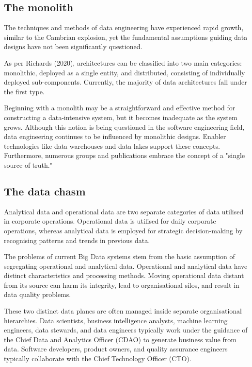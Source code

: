 \documentclass[preprint,12pt]{elsarticle}
\begin{document}
\subsection{The monolith}

The techniques and methods of data engineering have experienced rapid growth, similar to the Cambrian explosion, yet the fundamental assumptions guiding data designs have not been significantly questioned.

As per Richards (2020), architectures can be classified into two main categories: monolithic, deployed as a single entity, and distributed, consisting of individually deployed sub-components. Currently, the majority of data architectures fall under the first type. 

Beginning with a monolith may be a straightforward and effective method for constructing a data-intensive system, but it becomes inadequate as the system grows. Although this notion is being questioned in the software engineering field, data engineering continues to be influenced by monolithic designs. Enabler technologies like data warehouses and data lakes support these concepts. Furthermore, numerous groups and publications embrace the concept of a "single source of truth."

\subsection{The data chasm}

Analytical data and operational data are two separate categories of data utilised in corporate operations. Operational data is utilised for daily corporate operations, whereas analytical data is employed for strategic decision-making by recognising patterns and trends in previous data.

The problems of current Big Data systems stem from the basic assumption of segregating operational and analytical data. Operational and analytical data have distinct characteristics and processing methods. Moving operational data distant from its source can harm its integrity, lead to organisational silos, and result in data quality problems. 

These two distinct data planes are often managed inside separate organisational hierarchies. Data scientists, business intelligence analysts, machine learning engineers, data stewards, and data engineers typically work under the guidance of the Chief Data and Analytics Officer (CDAO) to generate business value from data. Software developers, product owners, and quality assurance engineers typically collaborate with the Chief Technology Officer (CTO).
\end{document}
